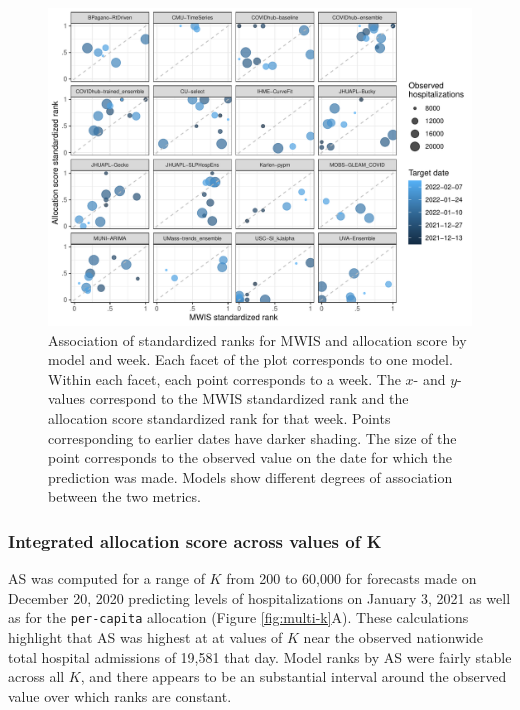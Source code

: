 \documentclass{article}\usepackage[]{graphicx}\usepackage[]{xcolor}
\makeatletter
\def\maxwidth{ %
  \ifdim\Gin@nat@width>\linewidth
    \linewidth
  \else
    \Gin@nat@width
  \fi
}
\newenvironment{knitrout}{}{} %
\makeatother
\begin{document}
\begin{knitrout}
\color{fgcolor}\begin{figure}[H]
\includegraphics[width=\maxwidth]{figure/metrics-correlation-1} \caption[Association of standardized ranks for MWIS and allocation score by model and week]{Association of standardized ranks for MWIS and allocation score by model and week. Each facet of the plot corresponds to one model. Within each facet, each point corresponds to a week. The $x$- and $y$-values correspond to the MWIS standardized rank and the allocation score standardized rank for that week. Points corresponding to earlier dates have darker shading. The size of the point corresponds to the observed value on the date for which the prediction was made. Models show different degrees of association between the two metrics.}\label{fig:metrics-correlation}
\end{figure}

\end{knitrout}




\subsubsection{Integrated allocation score across values of K}
\label{sec:ias_examp}



AS was computed for a range of $K$ from 200 to 60,000 for forecasts made on December 20, 2020 predicting levels of
hospitalizations on January 3, 2021 as well as for the \texttt{per-capita} allocation (Figure \ref{fig:multi-k}A). These
calculations highlight that AS was highest at at values of $K$ near the observed nationwide total hospital admissions of
19,581 that day. Model ranks by AS were fairly stable across all $K$, and there appears
to be an substantial interval around the observed value over which ranks are constant.
\end{document}
